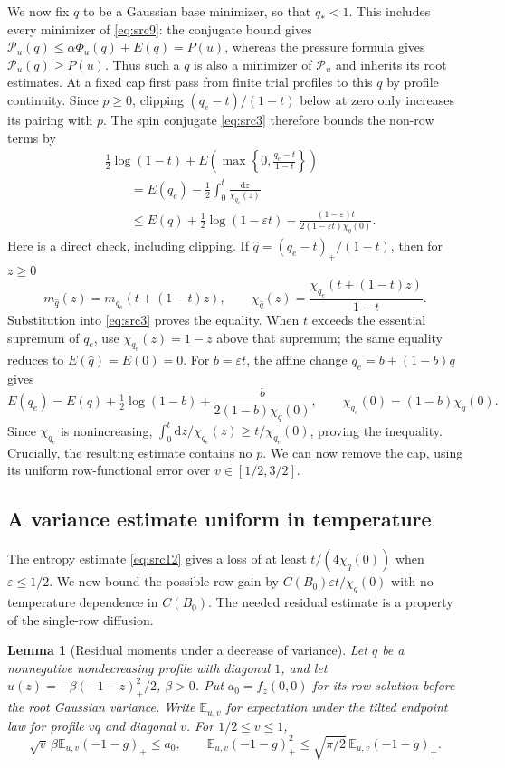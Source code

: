 \documentclass[11pt,a4paper]{article}
\numberwithin{equation}{section}
\newtheorem{lemma}[theorem]{Lemma}
\theoremstyle{definition}
\theoremstyle{remark}
\newcommand{\E}{\mathbb E}
\newcommand{\dd}{\mathrm d}
\newcommand{\eps}{\varepsilon}
\begin{document}
We now fix $q$ to be a Gaussian base minimizer, so that $q_*<1$.
This includes every minimizer of \eqref{eq:src9}: the conjugate bound
gives $\mathcal P_u(q)\le\alpha\Phi_u(q)+E(q)=P(u)$, whereas the
pressure formula gives $\mathcal P_u(q)\ge P(u)$.  Thus such a $q$ is
also a minimizer of $\mathcal P_u$ and inherits its root estimates.
At a fixed cap first pass from finite trial profiles to this $q$ by
profile continuity.  Since $p\ge0$, clipping
$(q_e-t)/(1-t)$ below at zero only increases its pairing with $p$.
The spin conjugate \eqref{eq:src3} therefore bounds the non-row terms by
\begin{equation}\label{eq:src12}
 \begin{split}
 &\frac12\log(1-t)+
 E\left(\max\left\{0,\frac{q_e-t}{1-t}\right\}\right)\\
 &\qquad=E(q_e)-\frac12\int_0^t\frac{\dd z}{\chi_{q_e}(z)}\\
 &\qquad\le E(q)+\frac12\log(1-\eps t)
 -\frac{(1-\eps)t}{2(1-\eps t)\chi_q(0)}.
 \end{split}
\end{equation}
Here is a direct check, including clipping.  If
$\widehat q=(q_e-t)_+/(1-t)$, then for $z\ge0$
\[
 m_{\widehat q}(z)=m_{q_e}(t+(1-t)z),\qquad
 \chi_{\widehat q}(z)=\frac{\chi_{q_e}(t+(1-t)z)}{1-t}.
\]
Substitution into \eqref{eq:src3} proves the equality.  When $t$ exceeds
the essential supremum of $q_e$, use
$\chi_{q_e}(z)=1-z$ above that supremum; the same equality reduces to
$E(\widehat q)=E(0)=0$.
For $b=\eps t$, the affine change $q_e=b+(1-b)q$ gives
\[
 E(q_e)=E(q)+\tfrac12\log(1-b)
       +\frac{b}{2(1-b)\chi_q(0)},\qquad
 \chi_{q_e}(0)=(1-b)\chi_q(0).
\]
Since $\chi_{q_e}$ is nonincreasing,
$\int_0^t\dd z/\chi_{q_e}(z)\ge t/\chi_{q_e}(0)$, proving the inequality.
Crucially, the resulting estimate contains no $p$.  We can now remove the
cap, using its uniform row-functional error over $v\in[1/2,3/2]$.

\subsection{A variance estimate uniform in temperature}

The entropy estimate \eqref{eq:src12} gives a loss of at least
$t/(4\chi_q(0))$ when $\eps\le1/2$. We now bound the possible row gain
by $C(B_0)\eps t/\chi_q(0)$ with no temperature dependence in $C(B_0)$.
The needed residual estimate is a property of the single-row diffusion.

\begin{lemma}[Residual moments under a decrease of variance]
\label{lem:univ-residual-variance}
Let $q$ be a nonnegative nondecreasing profile with diagonal $1$, and
let $u(z)=-\beta(-1-z)_+^2/2$, $\beta>0$.
Put $a_0=f_z(0,0)$ for its row solution before the root Gaussian variance.
Write $\E_{u,v}$ for expectation under the tilted endpoint law for profile
$vq$ and diagonal $v$. For $1/2\le v\le1$,
\begin{equation}\label{eq:src13}
 \sqrt v\,\beta\E_{u,v}(-1-g)_+\le a_0,
 \qquad
 \E_{u,v}(-1-g)_+^2
 \le \sqrt{\pi/2}\,\E_{u,v}(-1-g)_+.
\end{equation}
\end{lemma}
\end{document}
